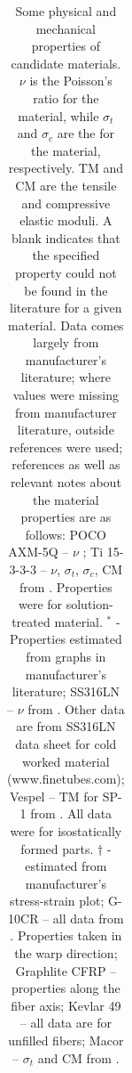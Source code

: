 \documentclass[final]{svjour2}
\begin{document}
\begin{table}[h]
\begin{tabular}{lrrrrrr}
 \bottomrule
\end{tabular}
\caption{Some physical and mechanical properties of candidate materials. $\nu$ is the Poisson's ratio for the material, while $\sigma_{t}$ and $\sigma_{c}$ are the \color{yellow}{tensile and compressive strengths <-yield, elastic limit, or UTS? } for the material, respectively. TM and CM are the tensile and compressive elastic moduli. A blank indicates that the specified property could not be found in the literature for a given material. Data comes largely from manufacturer's literature; where values were missing from manufacturer literature, outside references were used; references as well as relevant notes about the material properties are as follows: POCO AXM-5Q -- $\nu$ \cite{Swank2009}; Ti 15-3-3-3 -- $\nu$, $\sigma_t$, $\sigma_c$, CM from \cite{Lang2001}\cite{Johnson1996}\cite{Nyakana2005}. Properties were for solution-treated material. $^*$ - Properties estimated from graphs in manufacturer's literature; SS316LN -- $\nu$ from \cite{Shankar2001}. Other data are from SS316LN data sheet for cold worked material (www.finetubes.com); Vespel -- TM for SP-1 from \cite{Doty1981}. All data were for isostatically formed parts. $\dag$ - estimated from manufacturer's stress-strain plot; G-10CR -- all data from \cite{Kasen1981}\cite{Markley1985}. Properties taken in the warp direction; Graphlite CFRP -- properties along the fiber axis; Kevlar 49 -- all data are for unfilled fibers; Macor -- $\sigma_t$ and CM from \cite{Markley1985}\cite{websiteMacor}.}
\label{SW}
\end{table}
\end{document}
